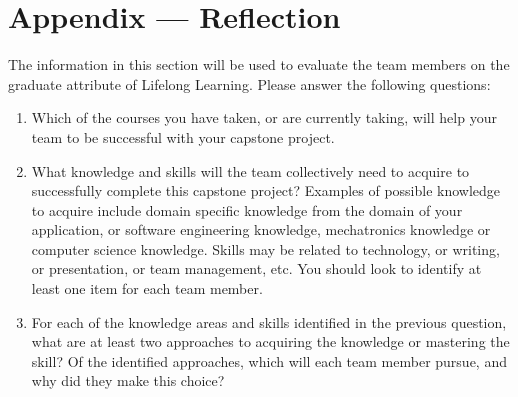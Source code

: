 \documentclass[12pt]{article}
\begin{document}

\newpage{}
\section*{Appendix --- Reflection}

The information in this section will be used to evaluate the team members on the
graduate attribute of Lifelong Learning.  Please answer the following questions:

\begin{enumerate}
  \item Which of the courses you have taken, or are currently taking, will help
  your team to be successful with your capstone project.
  \item What knowledge and skills will the team collectively need to acquire to
  successfully complete this capstone project?  Examples of possible knowledge
  to acquire include domain specific knowledge from the domain of your
  application, or software engineering knowledge, mechatronics knowledge or
  computer science knowledge.  Skills may be related to technology, or writing,
  or presentation, or team management, etc.  You should look to identify at
  least one item for each team member.
  \item For each of the knowledge areas and skills identified in the previous
  question, what are at least two approaches to acquiring the knowledge or
  mastering the skill?  Of the identified approaches, which will each team
  member pursue, and why did they make this choice?
\end{enumerate}
\end{document}
